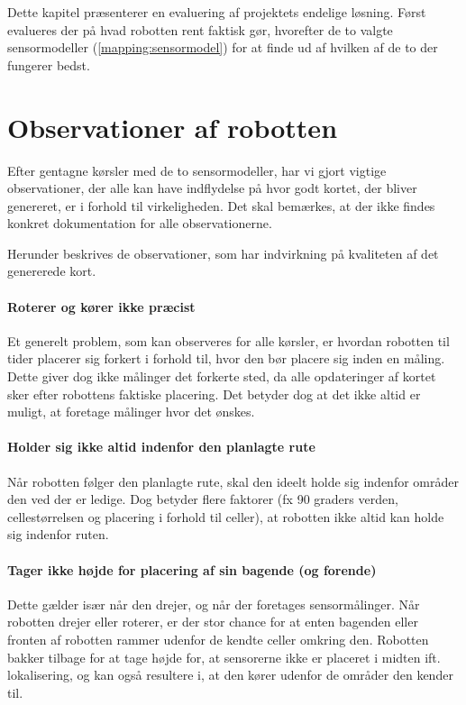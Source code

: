 Dette kapitel præsenterer en evaluering af projektets endelige løsning.
Først evalueres der på hvad robotten rent faktisk gør, hvorefter de to valgte sensormodeller (\cref{mapping:sensormodel}) for at finde ud af hvilken af de to der fungerer bedst.

\section{Observationer af robotten}
Efter gentagne kørsler med de to sensormodeller, har vi gjort vigtige observationer, der alle kan have indflydelse på hvor godt kortet, der bliver genereret, er i forhold til virkeligheden.
Det skal bemærkes, at der ikke findes konkret dokumentation for alle observationerne.

Herunder beskrives de observationer, som har indvirkning på kvaliteten af det genererede kort.

\paragraph{Roterer og kører ikke præcist}
Et generelt problem, som kan observeres for alle kørsler, er hvordan robotten til tider placerer sig forkert i forhold til, hvor den bør placere sig inden en måling.
Dette giver dog ikke målinger det forkerte sted, da alle opdateringer af kortet sker efter robottens faktiske placering. 
Det betyder dog at det ikke altid er muligt, at foretage målinger hvor det ønskes.

\paragraph{Holder sig ikke altid indenfor den planlagte rute}
Når robotten følger den planlagte rute, skal den ideelt holde sig indenfor områder den ved der er ledige.
Dog betyder flere faktorer (fx 90 graders verden, cellestørrelsen og placering i forhold til celler), at robotten ikke altid kan holde sig indenfor ruten.

\paragraph{Tager ikke højde for placering af sin bagende (og forende)}
Dette gælder især når den drejer, og når der foretages sensormålinger.
Når robotten drejer eller roterer, er der stor chance for at enten bagenden eller fronten af robotten rammer udenfor de kendte celler omkring den.
Robotten bakker tilbage for at tage højde for, at sensorerne ikke er placeret i midten ift. lokalisering, og kan også resultere i, at den kører udenfor de områder den kender til.

